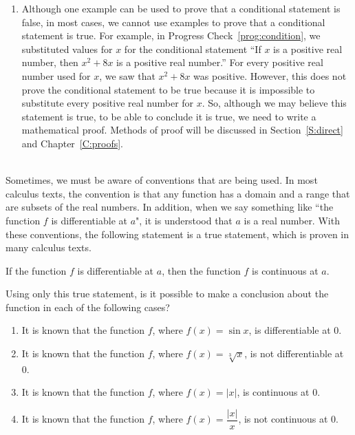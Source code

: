 \begin{enumerate}
\item Although one example can be used to prove that a conditional statement is false, in most cases, we cannot use examples to prove that a conditional statement is true.  For example, in Progress Check~\ref{prog:condition}, we substituted values for $x$ for the conditional statement ``If $x$ is a positive real number, then
\linebreak
$x^2 + 8x$ is a positive real number.''  For every positive real number used for $x$, we saw that $x^2 + 8x$ was positive.  However, this does not prove the conditional statement to be true because it is impossible to substitute every positive real number for $x$.  So, although we may believe this statement is true, to be able to conclude it is true, we need to write a mathematical proof.  Methods of proof will be discussed in Section~\ref{S:direct}  and Chapter~\ref{C:proofs}.
\end{enumerate}
\hbreak


\vskip6pt
\begin{prog}\label{pr:conditional} \hfill \\
Sometimes, we must be aware of conventions that are being used.  In most calculus texts, the convention is that any function has a domain and a range that are subsets  of the real numbers.  In addition, when we say something like ``the function $f$ is differentiable at $a$", it is understood that $a$ is a real number.  With these conventions, the following statement is a true statement, which is proven in many calculus texts.
\begin{center}
If the function  $f$  is differentiable at  $a$, then  the function   $f$  is continuous at  $a$.
\end{center}
\noindent
Using only this true statement, is it possible to make a conclusion about the function in each of the following cases?

\begin{enumerate}
\item It is known that the function  $f$, where   $f(x) = \sin x$, is differentiable at  0.
\item It is known that the function  $f$, where  $f(x) = \sqrt[3]{x}$, is not differentiable at  0.
\item It is known that the function  $f$, where   $f(x) = \left| x \right|$, is continuous at  0.
\item It is known that the function  $f$, where  $f(x) = \dfrac{{\left| x \right|}}{x}$, is not continuous at  0.
\end{enumerate}
\end{prog}
%
%
\hbreak


\endinput
